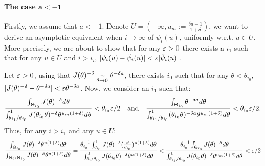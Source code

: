 \paragraph{The case $\mathbf{a<-1}$}
    Firstly, we assume that $a<-1$. Denote $U=(-\infty, u_m:=\frac{\delta a-1}{1+\delta})$, we want to derive an asymptotic equivalent when $i\to\infty$ of $\psi_i(u)$, uniformly w.r.t. $u\in U$.
    More precisely, we are about to show that for any $\varepsilon>0$ there exists a $i_1$ such that for any $u\in U$ and $i>i_i$, $|\psi_i(u)-\tilde\psi_i(u)|<\varepsilon|\tilde\psi_i(u)|$. %
    

    Let $\varepsilon>0$, using that $J(\theta)^{-\delta}\underset{\theta\rightarrow0}{\sim}\theta^{-\delta a}$, there exists $i_0$ such that for any $\theta<\theta_{i_0}$, $|J(\theta)^{-\delta}-\theta^{-\delta a}|<\varepsilon\theta^{-\delta a}$. %
    Now, we consider an $i_1$ such that: %
        \begin{equation}
            \frac{\int_{\Theta_{i_0}}J(\theta)^{-\delta}d\theta }{\int_{\theta_{i_1}/\theta_{i_0}}^1J(\theta_{i_0}\theta)^{-\delta}\theta^{u_m(1+\delta)} d\theta}<\theta_{i_0}\varepsilon/2\quad \text{and}\quad
            \frac{\int_{\Theta_{i_0}}\theta^{-\delta a}d\theta }{\int_{\theta_{i_1}/\theta_{i_0}}^1(\theta_{i_0}\theta)^{-\delta a}\theta^{u_m(1+\delta)} d\theta}<\theta_{i_0}\varepsilon/2.
        \end{equation}
    Thus, for any $i>i_1$  and any $u\in U$:
        \begin{equation}
            \frac{\int_{\Theta_{i_0}} J(\theta)^{-\delta}\theta^{u(1+\delta)}  d\theta}{\int_{\Theta_{i}\setminus\Theta_{i_0} } J(\theta)^{-\delta }\theta^{u(1+\delta)}d\theta }
            = 
            \frac{\theta_{i_0}^{-1}\int_{\theta_{i_0}}^1 J(\theta)^{-\delta}(\frac{\theta}{\theta_{i_0}})^{u(1+\delta)}  d\theta}{\int_{\theta_{i}/\theta_{i_0}}^1 J(\theta_{i_0}\theta)^{-\delta }\theta^{u(1+\delta)} d\theta } %
            < \frac{\theta_{i_0}^{-1}\int_{\Theta_{i_0} }J(\theta)^{-\delta} d\theta}{\int_{\theta_{i_1}/\theta_{i_0} }^1 J(\theta_{i_0}\theta)^{-\delta }\theta^{u_m(1+\delta)}d\theta} < \eps/2
        \end{equation}
